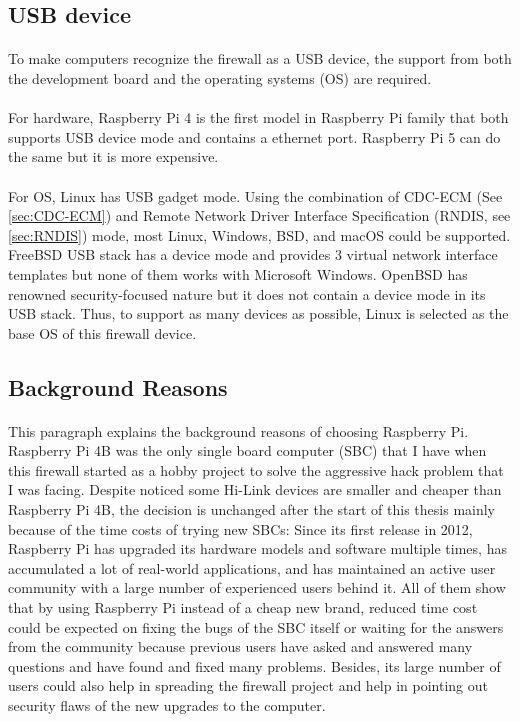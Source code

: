 \documentclass[mscthesis]{usiinfthesis}
\begin{document}
\subsection{USB device}
\paragraph{}
To make computers recognize the firewall as a USB device, the support from both the development board and the operating systems (OS) are required.
\paragraph{}
For hardware, Raspberry Pi 4 is the first model in Raspberry Pi family that both supports USB device mode and contains a ethernet port. Raspberry Pi 5 can do the same but it is more expensive.
\paragraph{}
For OS, Linux has USB gadget mode. Using the combination of CDC-ECM (See \cref{sec:CDC-ECM}) and Remote Network Driver Interface Specification (RNDIS, see \cref{sec:RNDIS}) mode, most Linux, Windows, BSD, and macOS could be supported. FreeBSD USB stack has a device mode and provides 3 virtual network interface templates but none of them works with Microsoft Windows\citep{freebsdhb:usb}. OpenBSD has renowned security-focused nature but it does not contain a device mode in its USB stack. Thus, to support as many devices as possible, Linux is selected as the base OS of this firewall device.

\subsection{Background Reasons}
\paragraph{}
This paragraph explains the background reasons of choosing Raspberry Pi. Raspberry Pi 4B was the only single board computer (SBC) that I have when this firewall started as a hobby project to solve the aggressive hack problem that I was facing. Despite noticed some Hi-Link devices are smaller and cheaper than Raspberry Pi 4B, the decision is unchanged after the start of this thesis mainly because of the time costs of trying new SBCs: Since its first release in 2012, Raspberry Pi has upgraded its hardware models and software multiple times, has accumulated a lot of real-world applications, and has maintained an active user community with a large number of experienced users behind it. All of them show that by using Raspberry Pi instead of a cheap new brand, reduced time cost could be expected on fixing the bugs of the SBC itself or waiting for the answers from the community because previous users have asked and answered many questions and have found and fixed many problems. Besides, its large number of users could also help in spreading the firewall project and help in pointing out security flaws of the new upgrades to the computer.
\end{document}
